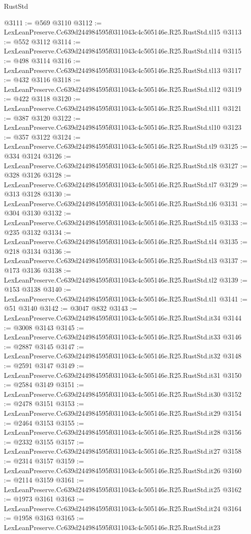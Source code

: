 \begin{lexlean}{RustStd}
\begin{coremodule}
@3111 := @569 @3110
@3112 := LexLeanPreserve.Cc639d244984595f0311043c4c505146e.R25.RustStd.tl15
@3113 := @552 @3112
@3114 := LexLeanPreserve.Cc639d244984595f0311043c4c505146e.R25.RustStd.tl14
@3115 := @498 @3114
@3116 := LexLeanPreserve.Cc639d244984595f0311043c4c505146e.R25.RustStd.tl13
@3117 := @432 @3116
@3118 := LexLeanPreserve.Cc639d244984595f0311043c4c505146e.R25.RustStd.tl12
@3119 := @422 @3118
@3120 := LexLeanPreserve.Cc639d244984595f0311043c4c505146e.R25.RustStd.tl11
@3121 := @387 @3120
@3122 := LexLeanPreserve.Cc639d244984595f0311043c4c505146e.R25.RustStd.tl10
@3123 := @357 @3122
@3124 := LexLeanPreserve.Cc639d244984595f0311043c4c505146e.R25.RustStd.tl9
@3125 := @334 @3124
@3126 := LexLeanPreserve.Cc639d244984595f0311043c4c505146e.R25.RustStd.tl8
@3127 := @328 @3126
@3128 := LexLeanPreserve.Cc639d244984595f0311043c4c505146e.R25.RustStd.tl7
@3129 := @313 @3128
@3130 := LexLeanPreserve.Cc639d244984595f0311043c4c505146e.R25.RustStd.tl6
@3131 := @304 @3130
@3132 := LexLeanPreserve.Cc639d244984595f0311043c4c505146e.R25.RustStd.tl5
@3133 := @235 @3132
@3134 := LexLeanPreserve.Cc639d244984595f0311043c4c505146e.R25.RustStd.tl4
@3135 := @218 @3134
@3136 := LexLeanPreserve.Cc639d244984595f0311043c4c505146e.R25.RustStd.tl3
@3137 := @173 @3136
@3138 := LexLeanPreserve.Cc639d244984595f0311043c4c505146e.R25.RustStd.tl2
@3139 := @153 @3138
@3140 := LexLeanPreserve.Cc639d244984595f0311043c4c505146e.R25.RustStd.tl1
@3141 := @51 @3140
@3142 := @3047 @832
@3143 := LexLeanPreserve.Cc639d244984595f0311043c4c505146e.R25.RustStd.it34
@3144 := @3008 @3143
@3145 := LexLeanPreserve.Cc639d244984595f0311043c4c505146e.R25.RustStd.it33
@3146 := @2887 @3145
@3147 := LexLeanPreserve.Cc639d244984595f0311043c4c505146e.R25.RustStd.it32
@3148 := @2591 @3147
@3149 := LexLeanPreserve.Cc639d244984595f0311043c4c505146e.R25.RustStd.it31
@3150 := @2584 @3149
@3151 := LexLeanPreserve.Cc639d244984595f0311043c4c505146e.R25.RustStd.it30
@3152 := @2478 @3151
@3153 := LexLeanPreserve.Cc639d244984595f0311043c4c505146e.R25.RustStd.it29
@3154 := @2464 @3153
@3155 := LexLeanPreserve.Cc639d244984595f0311043c4c505146e.R25.RustStd.it28
@3156 := @2332 @3155
@3157 := LexLeanPreserve.Cc639d244984595f0311043c4c505146e.R25.RustStd.it27
@3158 := @2314 @3157
@3159 := LexLeanPreserve.Cc639d244984595f0311043c4c505146e.R25.RustStd.it26
@3160 := @2114 @3159
@3161 := LexLeanPreserve.Cc639d244984595f0311043c4c505146e.R25.RustStd.it25
@3162 := @1973 @3161
@3163 := LexLeanPreserve.Cc639d244984595f0311043c4c505146e.R25.RustStd.it24
@3164 := @1958 @3163
@3165 := LexLeanPreserve.Cc639d244984595f0311043c4c505146e.R25.RustStd.it23

\end{coremodule}
\end{lexlean}
